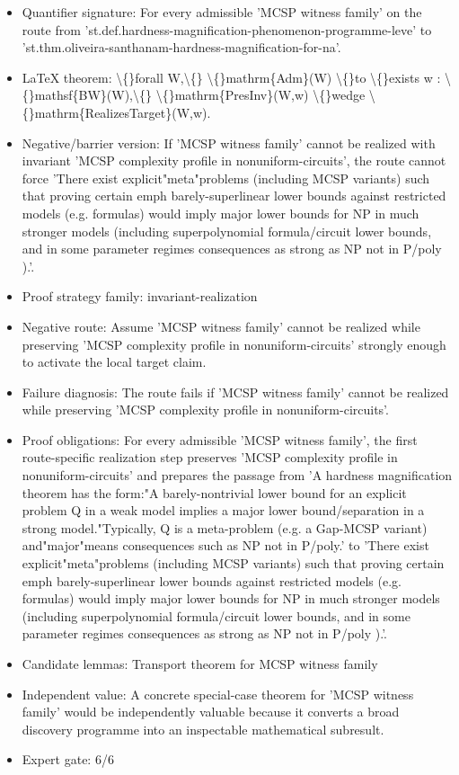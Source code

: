 \documentclass[11pt]{article}
\begin{document}
\begin{itemize}
\item Quantifier signature: For every admissible 'MCSP witness family' on the route from 'st.def.hardness-magnification-phenomenon-programme-leve' to 'st.thm.oliveira-santhanam-hardness-magnification-for-na'.
\item LaTeX theorem: \textbackslash\{\}forall W,\textbackslash\{\} \textbackslash\{\}mathrm\{Adm\}(W) \textbackslash\{\}to \textbackslash\{\}exists w : \textbackslash\{\}mathsf\{BW\}(W),\textbackslash\{\} \textbackslash\{\}mathrm\{PresInv\}(W,w) \textbackslash\{\}wedge \textbackslash\{\}mathrm\{RealizesTarget\}(W,w).
\item Negative/barrier version: If 'MCSP witness family' cannot be realized with invariant 'MCSP complexity profile in nonuniform-circuits', the route cannot force 'There exist explicit"meta"problems (including MCSP variants) such that proving certain emph barely-superlinear lower bounds against restricted models (e.g. formulas) would imply major lower bounds for NP in much stronger models (including superpolynomial formula/circuit lower bounds, and in some parameter regimes consequences as strong as NP not in P/poly ).'.
\item Proof strategy family: invariant-realization
\item Negative route: Assume 'MCSP witness family' cannot be realized while preserving 'MCSP complexity profile in nonuniform-circuits' strongly enough to activate the local target claim.
\item Failure diagnosis: The route fails if 'MCSP witness family' cannot be realized while preserving 'MCSP complexity profile in nonuniform-circuits'.
\item Proof obligations: For every admissible 'MCSP witness family', the first route-specific realization step preserves 'MCSP complexity profile in nonuniform-circuits' and prepares the passage from 'A hardness magnification theorem has the form:"A barely-nontrivial lower bound for an explicit problem Q in a weak model implies a major lower bound/separation in a strong model."Typically, Q is a meta-problem (e.g. a Gap-MCSP variant) and"major"means consequences such as NP not in P/poly.' to 'There exist explicit"meta"problems (including MCSP variants) such that proving certain emph barely-superlinear lower bounds against restricted models (e.g. formulas) would imply major lower bounds for NP in much stronger models (including superpolynomial formula/circuit lower bounds, and in some parameter regimes consequences as strong as NP not in P/poly ).'.
\item Candidate lemmas: Transport theorem for MCSP witness family
\item Independent value: A concrete special-case theorem for 'MCSP witness family' would be independently valuable because it converts a broad discovery programme into an inspectable mathematical subresult.
\item Expert gate: 6/6
\end{itemize}
\end{document}

